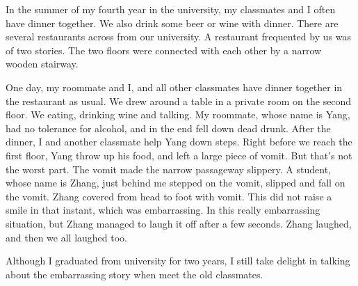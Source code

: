 \documentclass[12pt,a4paper]{caspset}
\begin{document}

In the summer of my fourth year in the university, my classmates and I often have dinner together. We also drink some beer or wine with dinner. There are several restaurants across from our university. A restaurant frequented by us was of two stories.  The two floors were connected with each other by a narrow wooden stairway. 

One day, my roommate and I, and all other classmates have dinner together in the restaurant as usual. We drew around a table in a private room on the second floor. We eating, drinking wine and talking. My roommate, whose name is Yang, had no tolerance for alcohol, and in the end fell down dead drunk. After the dinner, I and another classmate help Yang down steps. Right before we reach the first floor, Yang throw up his food, and left a large piece of vomit. But that's not the worst part. The vomit made the narrow passageway slippery. A student, whose name is Zhang, just behind me stepped on the vomit,  slipped and fall on the vomit. Zhang covered from head to foot with vomit. This did not raise a smile in that instant, which was embarrassing. In this really embarrassing situation, but Zhang managed to laugh it off after a few seconds. Zhang laughed, and then we all laughed too.


Although I graduated from university for two years, I still take delight in talking about the embarrassing story when meet the old classmates.
\end{document}
